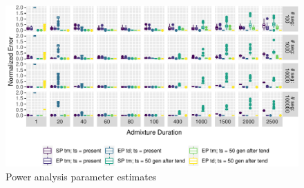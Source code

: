 \documentclass[11pt]{article}
\begin{document}
\begin{figure}
\centering
\includegraphics{ATE_Revisions_files/figure-latex/figR1_error_ests_norm-1.pdf}
\caption{\label{fig:figSR1_error_ests_norm} Power analysis parameter estimates}
\end{figure}
\end{document}
